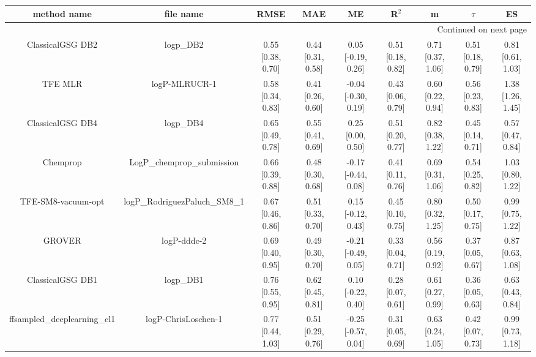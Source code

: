 \documentclass{article}
\begin{document}
\begin{center}
\scriptsize
\begin{longtable}{|ccccccccc|}
\toprule
                  method name &                                      file name &               RMSE &                MAE &                    ME &              R$^2$ &                     m &                $\tau$ &                    ES \\
\midrule
\endhead
\midrule
\multicolumn{9}{r}{{Continued on next page}} \\
\midrule
\endfoot

\bottomrule
\endlastfoot
             ClassicalGSG DB2 &                                      logp\_DB2 &  0.55 [0.38, 0.70] &  0.44 [0.31, 0.58] &    0.05 [-0.19, 0.26] &  0.51 [0.18, 0.82] &     0.71 [0.37, 1.06] &     0.51 [0.18, 0.79] &     0.81 [0.61, 1.03] \\
                      TFE MLR &                                  logP-MLRUCR-1 &  0.58 [0.34, 0.83] &  0.41 [0.26, 0.60] &   -0.04 [-0.30, 0.19] &  0.43 [0.06, 0.79] &     0.60 [0.22, 0.94] &     0.56 [0.23, 0.83] &     1.38 [1.26, 1.45] \\
             ClassicalGSG DB4 &                                      logp\_DB4 &  0.65 [0.49, 0.78] &  0.55 [0.41, 0.69] &     0.25 [0.00, 0.50] &  0.51 [0.20, 0.77] &     0.82 [0.38, 1.22] &     0.45 [0.14, 0.71] &     0.57 [0.47, 0.84] \\
                     Chemprop &                     LogP\_chemprop\_submission &  0.66 [0.39, 0.88] &  0.48 [0.30, 0.68] &   -0.17 [-0.44, 0.08] &  0.41 [0.11, 0.76] &     0.69 [0.31, 1.06] &     0.54 [0.25, 0.82] &     1.03 [0.80, 1.22] \\
           TFE-SM8-vacuum-opt &                  logP\_RodriguezPaluch\_SM8\_1 &  0.67 [0.46, 0.86] &  0.51 [0.33, 0.70] &    0.15 [-0.12, 0.43] &  0.45 [0.10, 0.75] &     0.80 [0.32, 1.25] &     0.50 [0.17, 0.75] &     0.99 [0.75, 1.22] \\
                       GROVER &                                    logP-dddc-2 &  0.69 [0.40, 0.95] &  0.49 [0.30, 0.70] &   -0.21 [-0.49, 0.05] &  0.33 [0.04, 0.71] &     0.56 [0.19, 0.92] &     0.37 [0.05, 0.67] &     0.87 [0.63, 1.08] \\
             ClassicalGSG DB1 &                                      logp\_DB1 &  0.76 [0.55, 0.95] &  0.62 [0.45, 0.81] &    0.10 [-0.22, 0.40] &  0.28 [0.07, 0.61] &     0.61 [0.27, 0.99] &     0.36 [0.05, 0.63] &     0.63 [0.43, 0.84] \\
   ffsampled_deeplearning_cl1 &                            logP-ChrisLoschen-1 &  0.77 [0.44, 1.03] &  0.51 [0.29, 0.76] &   -0.25 [-0.57, 0.04] &  0.31 [0.05, 0.69] &     0.63 [0.24, 1.05] &     0.42 [0.07, 0.73] &     0.99 [0.73, 1.18] \\

\end{longtable}
\end{center}
\end{document}
